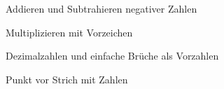\setcounter{aufgabe}{0}

\begin{aufgabe}{Addieren und Subtrahieren negativer Zahlen}
\end{aufgabe}

\begin{aufgabe}{Multiplizieren mit Vorzeichen}
\end{aufgabe}

\begin{aufgabe}{Dezimalzahlen und einfache Brüche als Vorzahlen}
\end{aufgabe}

\begin{aufgabe}{Punkt vor Strich mit Zahlen}
\end{aufgabe}

